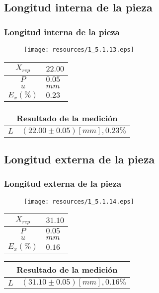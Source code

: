 \documentclass[letter,11pt]{beamer}
\begin{document}
\subsection{Longitud interna de la pieza}
\begin{frame}
\frametitle{Longitud interna de la pieza}
\vspace*{0.8cm}
\begin{figure}
\centering
\texttt{[image: resources/1\_5.1.13.eps]}
\end{figure}
\vspace*{0.4cm}
\scriptsize
\begin{tabular}{|c|>{\centering}m{1.8cm}<{\centering}|}
\hline
$X_{rep}$ &  $22.00$ \tabularnewline \hline
      $P$ &   $0.05$ \tabularnewline \hline
      $u$ &     $mm$ \tabularnewline \hline
$E_x(\%)$ &   $0.23$ \tabularnewline \hline
\end{tabular}
\quad
\begin{tabular}{|c|>{\centering}m{5.7cm}<{\centering}|}
\hline
\multicolumn{2}{|c|}{\textbf{Resultado de la medición}} \\ \hline
$L$ & $( 22.00\pm0.05)[mm], 0.23\%$ \tabularnewline \hline
\end{tabular}
\end{frame}

\subsection{Longitud externa de la pieza}
\begin{frame}
\frametitle{Longitud externa de la pieza}
\vspace*{0.8cm}
\begin{figure}
\centering
\texttt{[image: resources/1\_5.1.14.eps]}
\end{figure}
\vspace*{0.4cm}
\scriptsize
\begin{tabular}{|c|>{\centering}m{1.8cm}<{\centering}|}
\hline
$X_{rep}$ &  $31.10$ \tabularnewline \hline
      $P$ &   $0.05$ \tabularnewline \hline
      $u$ &     $mm$ \tabularnewline \hline
$E_x(\%)$ &   $0.16$ \tabularnewline \hline
\end{tabular}
\quad
\begin{tabular}{|c|>{\centering}m{5.7cm}<{\centering}|}
\hline
\multicolumn{2}{|c|}{\textbf{Resultado de la medición}} \\ \hline
$L$ & $( 31.10\pm0.05)[mm], 0.16\%$ \tabularnewline \hline
\end{tabular}
\end{frame}
\end{document}
